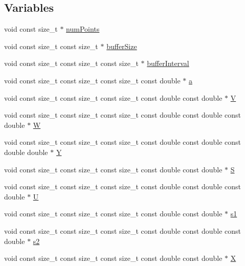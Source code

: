 \subsection*{Variables}
\begin{DoxyCompactItemize}
\item 
void const size\+\_\+t $\ast$ \hyperlink{SimpleKernels_8H_ab847e17018c49a895984dc0c0ce0c2c9}{num\+Points}
\item 
void const size\+\_\+t const size\+\_\+t $\ast$ \hyperlink{SimpleKernels_8H_ac77f5c22ba0f12d03d5b658f0d0117b4}{buffer\+Size}
\item 
void const size\+\_\+t const size\+\_\+t const size\+\_\+t $\ast$ \hyperlink{SimpleKernels_8H_a53ab06d6b324b77670d28550daa25d14}{buffer\+Interval}
\item 
void const size\+\_\+t const size\+\_\+t const size\+\_\+t const double $\ast$ \hyperlink{SimpleKernels_8H_a80f0b648bfd720a2277538fbad1d1eca}{a}
\item 
void const size\+\_\+t const size\+\_\+t const size\+\_\+t const double const double $\ast$ \hyperlink{SimpleKernels_8H_afbd617fe026d7bc5c305ad678d156dbe}{V}
\item 
void const size\+\_\+t const size\+\_\+t const size\+\_\+t const double const double const double $\ast$ \hyperlink{SimpleKernels_8H_a47539bc7159e013320007f51fcbf1fe3}{W}
\item 
void const size\+\_\+t const size\+\_\+t const size\+\_\+t const double const double const double double $\ast$ \hyperlink{SimpleKernels_8H_a4731ec58a5102a3b2d3116eaff33f108}{Y}
\item 
void const size\+\_\+t const size\+\_\+t const size\+\_\+t const double const double $\ast$ \hyperlink{SimpleKernels_8H_a1851b05129a14a393984de733889e64b}{S}
\item 
void const size\+\_\+t const size\+\_\+t const size\+\_\+t const double const double const double $\ast$ \hyperlink{SimpleKernels_8H_aca4ab6143606c908fb1a7de286ddddae}{U}
\item 
void const size\+\_\+t const size\+\_\+t const size\+\_\+t const double const double $\ast$ \hyperlink{SimpleKernels_8H_aa6a88b876ab61540ae31ae77644dea1d}{s1}
\item 
void const size\+\_\+t const size\+\_\+t const size\+\_\+t const double const double const double $\ast$ \hyperlink{SimpleKernels_8H_a50ce1cee1a1ec9524c1fc05834b4393f}{s2}
\item 
void const size\+\_\+t const size\+\_\+t const size\+\_\+t const double const double $\ast$ \hyperlink{SimpleKernels_8H_a1d2fc0c1bfd9fbd97521ac2a8082cd60}{X}

\end{DoxyCompactItemize}
